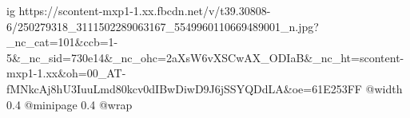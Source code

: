  
 
 
 
 

\ifcmt
  ig https://scontent-mxp1-1.xx.fbcdn.net/v/t39.30808-6/250279318_3111502289063167_5549960110669489001_n.jpg?_nc_cat=101&ccb=1-5&_nc_sid=730e14&_nc_ohc=2aXsW6vXSCwAX_ODIaB&_nc_ht=scontent-mxp1-1.xx&oh=00_AT-fMNkcAj8hU3IuuLmd80kcv0dIBwDiwD9J6jSSYQDdLA&oe=61E253FF
  @width 0.4
  @minipage 0.4
  @wrap \parpic[r]
\fi
